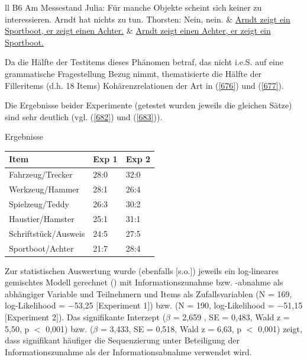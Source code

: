 \begin{exe}
	\ex\label{681}
	\begin{tabular}[t]{ll}
	 {B6 Am Messestand} \tabularnewline
	 {Julia: Für manche Objekte scheint sich keiner zu interessieren. Arndt} 					
	\tabularnewline
	 {hat nichts zu tun.} 					
	\tabularnewline
	Thorsten: Nein, nein. & \underline{Arndt zeigt ein Sportboot, er zeigt einen Achter.} \tabularnewline
	{} & \underline{Arndt zeigt einen Achter, er zeigt ein Sportboot.}
    \end{tabular}
\end{exe}
Da die Hälfte der Testitems dieses Phänomen betraf, das nicht i.e.S. auf eine grammatische Fragestellung Bezug nimmt, thematisierte die Hälfte der Filleritems (d.h. 18 Items) Kohärenzrelationen  der Art in (\ref{676}) und (\ref{677}).

Die Ergebnisse beider Experimente (getestet wurden jeweils die gleichen Sätze) sind sehr deutlich (vgl. (\ref{682}) und (\ref{683})).

\begin{exe}
	\ex\label{682} Ergebnisse\\[-1em]
	\begin{tabular}[t]{|l|l|l|}
	\hline
	\textbf{Item} & Exp 1 & Exp 2 \\
	\hline
	Fahrzeug/Trecker & 28:0 & 32:0\\
	\hline
	Werkzeug/Hammer & 28:1 & 26:4\\
	\hline
	Spielzeug/Teddy & 26:3 & 30:2\\
	\hline
	Haustier/Hamster & 25:1 & 31:1\\
	\hline
	Schriftstück/Ausweis & 24:5 & 27:5\\
	\hline
	Sportboot/Achter & 21:7 & 28:4\\
	\hline
    \end{tabular}
\end{exe}
Zur statistischen Auswertung wurde (ebenfalls $[$s.o.$]$) jeweils ein log-lineares gemischtes Modell gerechnet (\citealt{Baayen2008}) mit Informationszunahme bzw. -abnahme als abhängiger Variable und Teilnehmern und Items als Zufallsvariablen (N = 169, log-Likelihood = $\minus$53,25 $[$Experiment 1$]$) bzw. (N = 190, log-Likelihood = $\minus$51,15 $[$Experiment 2$]$). Das signifikante Interzept ($\beta$ =  2,659 , SE = 0,483, Wald z = 5,50, p $<$ 0,001) bzw. ($\beta$ =  3,433, SE = 0,518, Wald z = 6,63, p $<$ 0,001) zeigt, dass signifikant häufiger die Sequenzierung unter Beteiligung der Informationszunahme als der Informationsabnahme verwendet wird.


